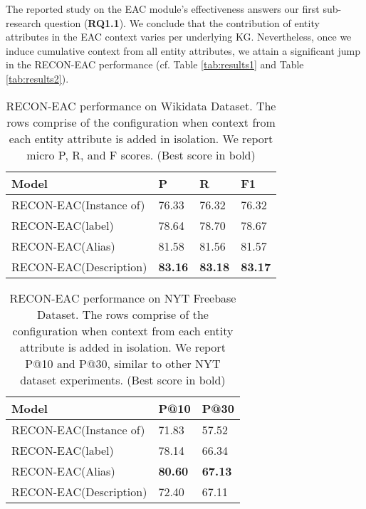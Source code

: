 \documentclass[sigconf]{acmart}
\begin{document}
The reported study on the EAC module's effectiveness answers our first sub-research question (\textbf{RQ1.1}). We conclude that the contribution of entity attributes in the EAC context varies per underlying KG. Nevertheless, once we induce cumulative context from all entity attributes, we attain a significant jump in the RECON-EAC performance (cf. Table \ref{tab:results1} and Table \ref{tab:results2}).

\begin{table}[!htb]
    \centering
    \begin{tabular}{p{4.5cm}|p{0.8cm}|p{0.8cm}|p{0.8cm}}
\toprule
\textbf{Model} & \textbf{P} & \textbf{R} & \textbf{F1} \\
\midrule
RECON-EAC(Instance of) & 76.33 & 76.32 & 76.32 \\
        RECON-EAC(label) & 78.64 & 78.70 & 78.67 \\
RECON-EAC(Alias) & 81.58 & 81.56 & 81.57 \\
          RECON-EAC(Description) & \textbf{83.16} & \textbf{83.18} & \textbf{83.17} \\
\bottomrule
    \end{tabular}
    \caption{RECON-EAC performance on Wikidata Dataset. The rows comprise of the configuration when context from each entity attribute is added in isolation. We report micro P, R, and F scores. (Best score in bold)}
    \label{tab:tab-abl1}
        \vspace{-2mm}
\end{table} 

\begin{table}[!htb]
    \centering
    \begin{tabular}{p{3.5cm}|p{0.8cm}|p{0.8cm}}
\toprule
\textbf{Model} & \textbf{P@10} & \textbf{P@30} \\
\midrule
RECON-EAC(Instance of) & 71.83 & 57.52  \\
        RECON-EAC(label) & 78.14 & 66.34 \\
RECON-EAC(Alias) & \textbf{80.60} & \textbf{67.13} \\
          RECON-EAC(Description) & 72.40 & 67.11 \\
\bottomrule
    \end{tabular}
    \caption{RECON-EAC performance on NYT Freebase Dataset. The rows comprise of the configuration when context from each entity attribute is added in isolation. We report P@10 and P@30, similar to other NYT dataset experiments. (Best score in bold)}
    \label{tab:tab-abl1nyt}
        \vspace{-2mm}
\end{table} 
\end{document}
